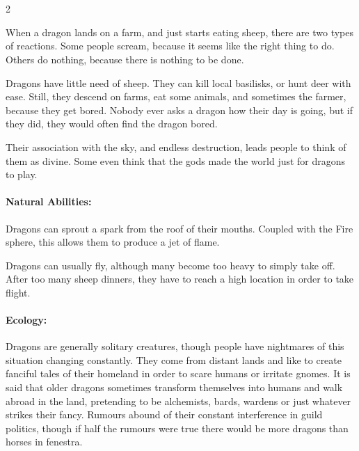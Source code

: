 \section{}
\label{dragon}

\begin{multicols}{2}


\noindent
When a dragon lands on a farm, and just starts eating sheep, there are two types of reactions.
Some people scream, because it seems like the right thing to do.
Others do nothing, because there is nothing to be done.

Dragons have little need of sheep.
They can kill local \glspl{basilisk}, or hunt deer with ease.
Still, they descend on farms, eat some animals, and sometimes the farmer, because they get bored.
Nobody ever asks a dragon how their day is going, but if they did, they would often find the dragon bored.

Their association with the sky, and endless destruction, leads people to think of them as divine.
Some even think that the gods made the world just for dragons to play.

\paragraph{Natural Abilities:}
Dragons can sprout a spark from the roof of their mouths.
Coupled with the Fire sphere, this allows them to produce a jet of flame.

Dragons can usually fly, although many become too heavy to simply take off.
After too many sheep dinners, they have to reach a high location in order to take flight.

\paragraph{Ecology:} Dragons are generally solitary creatures, though people have nightmares of this situation changing constantly.
They come from distant lands and like to create fanciful tales of their homeland in order to scare humans or irritate gnomes.
It is said that older dragons sometimes transform themselves into humans and walk abroad in the land, pretending to be alchemists, bards, \glspl{warden} or just whatever strikes their fancy.
Rumours abound of their constant interference in guild politics, though if half the rumours were true there would be more dragons than horses in \gls{fenestra}.


\end{multicols}
